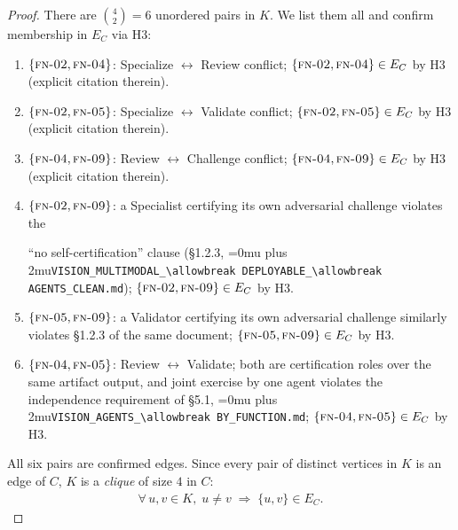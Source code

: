 \documentclass[12pt]{article}
\theoremstyle{definition}
\DeclareRobustCommand{\code}[1]{\begingroup\Urlmuskip=0mu plus 2mu\relax\nolinkurl{#1}\endgroup}
\newcommand{\FN}[1]{\textsc{fn-#1}}
\newcommand{\VisionClean}{\code{VISION\_MULTIMODAL\_\allowbreak DEPLOYABLE\_\allowbreak AGENTS\_CLEAN.md}}
\newcommand{\VisionFunc}{\code{VISION\_AGENTS\_\allowbreak BY\_FUNCTION.md}}
\begin{document}
\begin{proof}
There are $\binom{4}{2} = 6$ unordered pairs in $K$.
We list them all and confirm membership in $E_C$ via H3:
\begin{enumerate}
    \item[II.1] $\{\FN{02},\FN{04}\}$: Specialize $\leftrightarrow$
                Review conflict; $\{\FN{02},\FN{04}\} \in E_C$
                by H3 (explicit citation therein).
    \item[II.2] $\{\FN{02},\FN{05}\}$: Specialize $\leftrightarrow$
                Validate conflict; $\{\FN{02},\FN{05}\} \in E_C$
                by H3 (explicit citation therein).
    \item[II.3] $\{\FN{04},\FN{09}\}$: Review $\leftrightarrow$
                Challenge conflict; $\{\FN{04},\FN{09}\} \in E_C$
                by H3 (explicit citation therein).
    \item[II.4] $\{\FN{02},\FN{09}\}$: a Specialist certifying its
                own adversarial challenge violates the
                \begin{sloppypar}
                ``no self-certification'' clause (\S1.2.3,
                \VisionClean{});
                $\{\FN{02},\FN{09}\} \in E_C$ by H3.
                \end{sloppypar}
    \item[II.5] $\{\FN{05},\FN{09}\}$: a Validator certifying its
                own adversarial challenge similarly violates \S1.2.3
                of the same document;
                $\{\FN{05},\FN{09}\} \in E_C$ by H3.
    \item[II.6] $\{\FN{04},\FN{05}\}$: Review $\leftrightarrow$
                Validate; both are certification roles over the same
                artifact output, and joint exercise by one agent
                violates the independence requirement of \S5.1,
                \VisionFunc{};
                $\{\FN{04},\FN{05}\} \in E_C$ by H3.
\end{enumerate}

\noindent All six pairs are confirmed edges.  Since every pair of
distinct vertices in $K$ is an edge of $C$, $K$ is a \emph{clique} of
size $4$ in $C$:
\begin{align}
    \label{eq:clique}
    \forall\, u, v \in K,\; u \neq v
    \;\Longrightarrow\;
    \{u,v\} \in E_C.
\end{align}


\end{proof}
\end{document}
